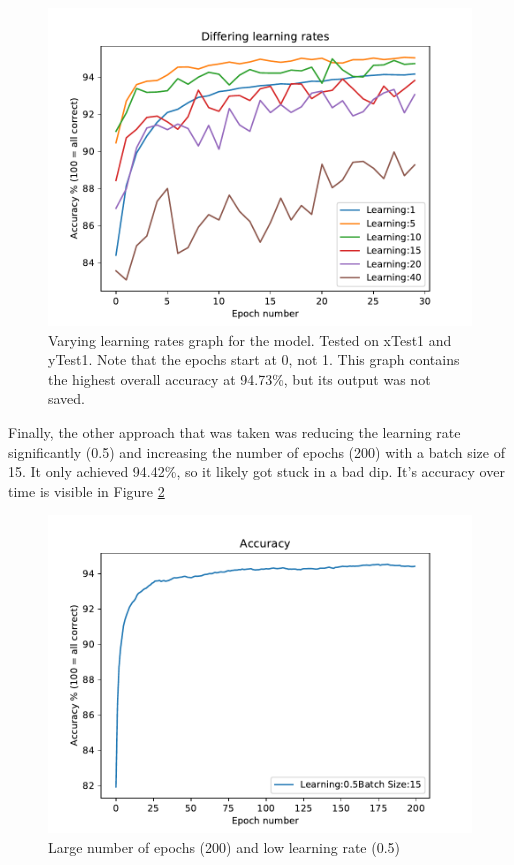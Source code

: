\documentclass{article}
\begin{document}
\begin{figure}[ht]
    \centering
    \includegraphics[scale=1]{learningGraphRefined.pdf}
    \caption{
        Varying learning rates graph for the model. Tested on xTest1 and yTest1.
        Note that the epochs start at 0, not 1. This graph contains the highest
        overall accuracy at 94.73\%, but its output was not saved.
    }
    \label{refinedLearning}
\end{figure}

\newpage
Finally, the other approach that was taken was reducing the learning rate
significantly (0.5) and increasing the number of epochs (200) with a batch size
of 15. It only achieved 94.42\%, so it likely got stuck in a bad dip. It's
accuracy over time is visible in Figure \ref{longlong}

\begin{figure}[ht]
    \centering
    \includegraphics[scale=1]{longlong.pdf}
    \caption{
        Large number of epochs (200) and low learning rate (0.5)
    }
    \label{longlong}
\end{figure}
\end{document}
